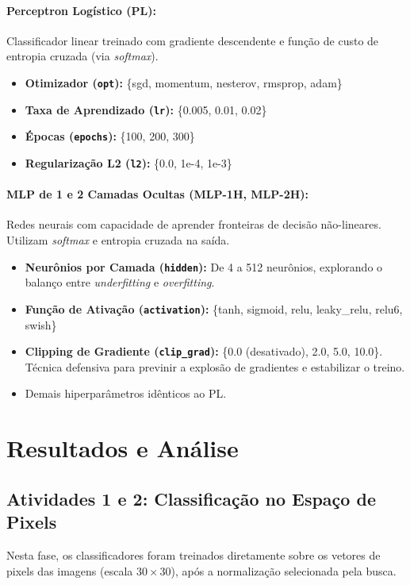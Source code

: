 \documentclass[a4paper,12pt]{article}
\begin{document}
\paragraph{Perceptron Logístico (PL):}
Classificador linear treinado com gradiente descendente e função de custo de entropia cruzada (via \emph{softmax}).
\begin{itemize}
    \item \textbf{Otimizador (\texttt{opt}):} \{sgd, momentum, nesterov, rmsprop, adam\}
    \item \textbf{Taxa de Aprendizado (\texttt{lr}):} \{0.005, 0.01, 0.02\}
    \item \textbf{Épocas (\texttt{epochs}):} \{100, 200, 300\}
    \item \textbf{Regularização L2 (\texttt{l2}):} \{0.0, 1e-4, 1e-3\}
\end{itemize}

\paragraph{MLP de 1 e 2 Camadas Ocultas (MLP-1H, MLP-2H):}
Redes neurais com capacidade de aprender fronteiras de decisão não-lineares. Utilizam \emph{softmax} e entropia cruzada na saída.
\begin{itemize}
    \item \textbf{Neurônios por Camada (\texttt{hidden}):} De 4 a 512 neurônios, explorando o balanço entre \emph{underfitting} e \emph{overfitting}.
    \item \textbf{Função de Ativação (\texttt{activation}):} \{tanh, sigmoid, relu, leaky\_relu, relu6, swish\}
    \item \textbf{Clipping de Gradiente (\texttt{clip\_grad}):} \{0.0 (desativado), 2.0, 5.0, 10.0\}. Técnica defensiva para previnir a explosão de gradientes e estabilizar o treino.
    \item Demais hiperparâmetros idênticos ao PL.
\end{itemize}

\section{Resultados e Análise}

\subsection{Atividades 1 e 2: Classificação no Espaço de Pixels}
Nesta fase, os classificadores foram treinados diretamente sobre os vetores de pixels das imagens (escala \(30\times 30\)), após a normalização selecionada pela busca.
\end{document}
